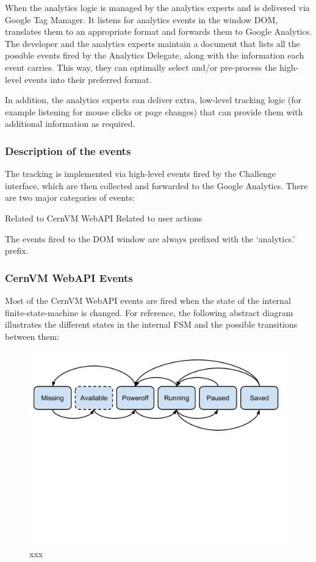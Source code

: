 \documentclass{article}
\begin{document}
When the analytics logic is managed by the analytics experts and is delivered via Google Tag Manager. It listens for analytics events in the window DOM, translates them to an appropriate format and forwards them to Google Analytics. The developer and the analytics experts maintain a document that lists all the possible events fired by the Analytics Delegate, along with the information each event carries. This way, they can optimally select and/or pre-process the high-level events into their preferred format.

In addition, the analytics experts can deliver extra, low-level tracking logic (for example listening for mouse clicks or page changes) that can provide them with additional information as required.

\subsubsection{Description of the events}

The tracking is implemented via high-level events fired by the Challenge interface, which are then collected and forwarded to the Google Analytics. There are two major categories of events:

Related to CernVM WebAPI 
Related to user actions

The events fired to the DOM window are always prefixed with the ‘analytics.’ prefix.

\subsubsection{CernVM WebAPI Events}

Most of the CernVM WebAPI events are fired when the state of the internal finite-state-machine is changed. For reference, the following abstract diagram illustrates the different states in the internal FSM and the possible transitions between them:



\begin{figure}[t]
  \begin{center}
		\includegraphics[width=\columnwidth]{imgs/webAPIEvents.pdf}
  \end{center}
\caption{xxx}
\label{xxx}
\end{figure}
\end{document}
